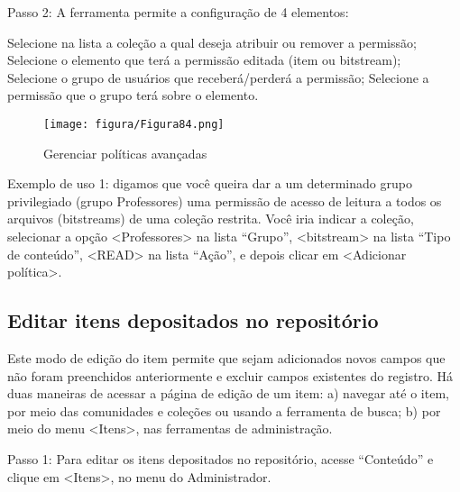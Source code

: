 \documentclass[12pt,hidelinks]{article}
\begin{document}
    \singlespacing
    
    Passo 2: A ferramenta permite a configuração de 4 elementos:
    
    \singlespacing
    
    \textbullet \hspace{6pt} Selecione na lista a coleção a qual deseja atribuir ou remover a permissão; \\
    \textbullet \hspace{6pt} Selecione o elemento que terá a permissão editada (item ou bitstream); \\
    \textbullet \hspace{6pt} Selecione o grupo de usuários que receberá/perderá a permissão; 
    \textbullet \hspace{6pt} Selecione a permissão que o grupo terá sobre o elemento.
    
    \begin{figure}[!htp]
                \centering
                \texttt{[image: figura/Figura84.png]}
                \caption{Gerenciar políticas avançadas}
            \label{Rotulo}
        \end{figure}
    
\newpage
    
    Exemplo de uso 1: digamos que você queira dar a um determinado grupo privilegiado (grupo Professores) uma permissão de acesso de leitura a todos os arquivos (bitstreams) de uma coleção restrita. Você iria indicar a coleção, selecionar a opção <Professores> na lista “Grupo”, <bitstream> na lista “Tipo de conteúdo”, <READ> na lista “Ação”, e depois clicar em <Adicionar política>.
    
    \subsection{Editar itens depositados no repositório}
    
    Este modo de edição do item permite que sejam adicionados novos campos que não foram preenchidos anteriormente e excluir campos existentes do registro. Há duas maneiras de acessar a página de edição de um item: a) navegar até o item, por meio das comunidades e coleções ou usando a ferramenta de busca; b) por meio do menu <Itens>, nas ferramentas de administração.
    
    \singlespacing
    
    Passo 1: Para editar os itens depositados no repositório, acesse “Conteúdo” e clique em <Itens>, no menu do Administrador. 
    
\end{document}
